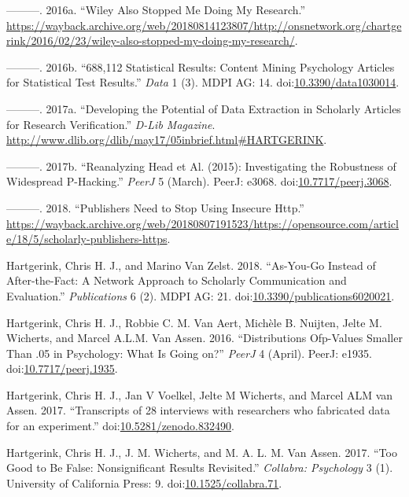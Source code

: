\documentclass[a5paper]{book}
\begin{document}
\hypertarget{ref-ons-wiley}{}
---------. 2016a. ``Wiley Also Stopped Me Doing My Research.''
\url{https://wayback.archive.org/web/20180814123807/http://onsnetwork.org/chartgerink/2016/02/23/wiley-also-stopped-my-doing-my-research/}.

\hypertarget{ref-doi:10.3390ux2fdata1030014}{}
---------. 2016b. ``688,112 Statistical Results: Content Mining
Psychology Articles for Statistical Test Results.'' \emph{Data} 1 (3).
MDPI AG: 14.
doi:\href{https://doi.org/10.3390/data1030014}{10.3390/data1030014}.

\hypertarget{ref-Hartgerink-dlib2017}{}
---------. 2017a. ``Developing the Potential of Data Extraction in
Scholarly Articles for Research Verification.'' \emph{D-Lib Magazine}.
\url{http://www.dlib.org/dlib/may17/05inbrief.html\#HARTGERINK}.

\hypertarget{ref-doi:10.7717ux2fpeerj.3068}{}
---------. 2017b. ``Reanalyzing Head et Al. (2015): Investigating the
Robustness of Widespread P-Hacking.'' \emph{PeerJ} 5 (March). PeerJ:
e3068.
doi:\href{https://doi.org/10.7717/peerj.3068}{10.7717/peerj.3068}.

\hypertarget{ref-https-hartgerink}{}
---------. 2018. ``Publishers Need to Stop Using Insecure Http.''
\url{https://wayback.archive.org/web/20180807191523/https://opensource.com/article/18/5/scholarly-publishers-https}.

\hypertarget{ref-doi:10.3390ux2fpublications6020021}{}
Hartgerink, Chris H. J., and Marino Van Zelst. 2018. ``As-You-Go Instead
of After-the-Fact: A Network Approach to Scholarly Communication and
Evaluation.'' \emph{Publications} 6 (2). MDPI AG: 21.
doi:\href{https://doi.org/10.3390/publications6020021}{10.3390/publications6020021}.

\hypertarget{ref-doi:10.7717ux2fpeerj.1935}{}
Hartgerink, Chris H. J., Robbie C. M. Van Aert, Michèle B. Nuijten,
Jelte M. Wicherts, and Marcel A.L.M. Van Assen. 2016. ``Distributions
Ofp-Values Smaller Than .05 in Psychology: What Is Going on?''
\emph{PeerJ} 4 (April). PeerJ: e1935.
doi:\href{https://doi.org/10.7717/peerj.1935}{10.7717/peerj.1935}.

\hypertarget{ref-doi:10.5281ux2fzenodo.832490}{}
Hartgerink, Chris H. J., Jan V Voelkel, Jelte M Wicherts, and Marcel ALM
van Assen. 2017. ``Transcripts of 28 interviews with researchers who
fabricated data for an experiment.''
doi:\href{https://doi.org/10.5281/zenodo.832490}{10.5281/zenodo.832490}.

\hypertarget{ref-doi:10.1525ux2fcollabra.71}{}
Hartgerink, Chris H. J., J. M. Wicherts, and M. A. L. M. Van Assen.
2017. ``Too Good to Be False: Nonsignificant Results Revisited.''
\emph{Collabra: Psychology} 3 (1). University of California Press: 9.
doi:\href{https://doi.org/10.1525/collabra.71}{10.1525/collabra.71}.
\end{document}
